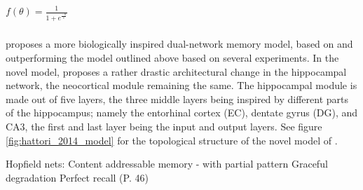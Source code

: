 \begin{center}
\begin{math}
    f(\theta) = \frac{1}{1 + e^{\frac{-\theta}{\epsilon}}}
\end{math}
\end{center}

\subsubsection{\cite{Hattori2014}}
\cite{Hattori2014} proposes a more biologically inspired dual-network memory model, based on and outperforming the model outlined above based on several experiments. In the novel model, \cite{Hattori2014} proposes a rather drastic architectural change in the hippocampal network, the neocortical module remaining the same. The hippocampal module is made out of five layers, the three middle layers being inspired by different parts of the hippocampus; namely the entorhinal cortex (EC), dentate gyrus (DG), and CA3, the first and last layer being the input and output layers. See figure \ref{fig:hattori_2014_model} for the topological structure of the novel model of \cite{Hattori2014}.


Hopfield nets:
Content addressable memory - with partial pattern
Graceful degradation
Perfect recall (P. 46)


